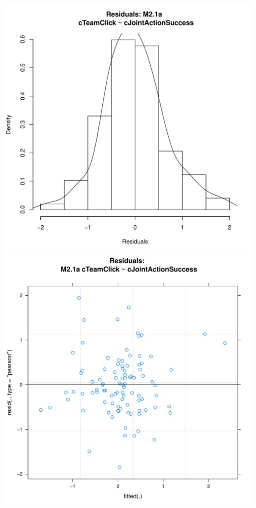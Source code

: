 \documentclass[12pt]{report}
\begin{document}
\newpage
\centering
\includegraphics[scale =.4]{../images/MLM21aHist.pdf}
\includegraphics[scale =.4]{../images/MLM21aScatter.pdf}
\end{document}
